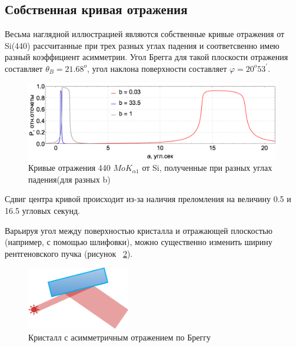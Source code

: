\subsection{Собственная кривая отражения}
\label{sec:rocking_curve_section}
Весьма наглядной иллюстрацией являются собственные кривые отражения от Si(440) рассчитанные при
трех разных углах падения и соответсвенно имею разный коэффициент асимметрии. Угол
Брегга для такой плоскости отражения составляет $\theta_B = 21.68^o$, угол наклона поверхности
составляет $\varphi = 20^o 53^{'}$.

\begin{figure}[H]
\centering
\includegraphics[width=0.99\textwidth]{images/rocking_curve_assym_3.png}
\caption{Кривые отражения 440 $MoK_{\alpha 1}$ от Si, полученные при разных углах падения(для разных b)}
\label{ris:rocking_curve_assym_3}
\end{figure}
Сдвиг центра кривой происходит из-за наличия преломления на величину 0.5 и 16.5 угловых секунд.

Варьируя угол между поверхностью кристалла и отражающей плоскостью (например, с помощью шлифовки),
можно существенно изменить ширину рентгеновского пучка (рисунок ~\ref{ris:assym_width_beam}).
\begin{figure}[H]
 \centering
 \includegraphics[width=0.4\textwidth]{images/assym_width_beam.png}
 \caption{Кристалл с асимметричным отражением по Бреггу}
 \label{ris:assym_width_beam}
\end{figure}

